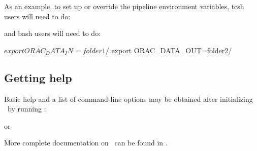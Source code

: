 As an example, to set up or override the pipeline environment variables, tcsh users will need to do:

\begin{terminalv}
\end{terminalv}

and bash users will need to do:

\begin{terminalv}
$ export ORAC_DATA_IN=folder1/
$ export ORAC_DATA_OUT=folder2/
\end{terminalv}
 

\subsection{Getting help}

Basic help and a list of command-line options may be obtained after
initializing \oracdr\ by running :
\begin{terminalv}
\end{terminalv}
or
\begin{terminalv}
\end{terminalv}

More complete documentation on \oracdr\ can be found in \oracsun.

